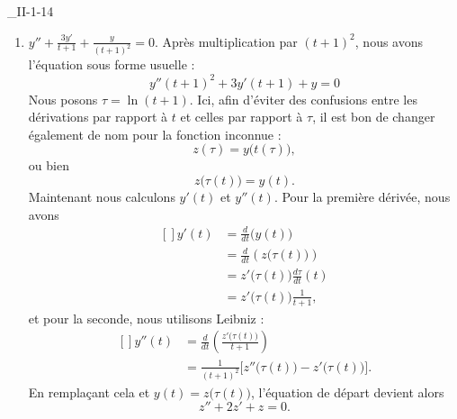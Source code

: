 \begin{corrige}{_II-1-14}

	\begin{enumerate}

		\item $y''+\frac{ 3y' }{ t+1 }+\frac{ y }{ (t+1)^2 }=0$.
		      Après multiplication par $(t+1)^2$, nous avons l'équation sous forme usuelle :
		      \begin{equation}	\label{EqEulerSSFormeII114}
			      y''(t+1)^2+3y'(t+1)+y=0
		      \end{equation}
		      Nous posons $\tau=\ln(t+1)$. Ici, afin d'éviter des confusions entre les dérivations par rapport à $t$ et celles par rapport à $\tau$, il est bon de changer également de nom pour la fonction inconnue :
		      \begin{equation}
			      z(\tau)=y\big( t(\tau) \big),
		      \end{equation}
		      ou bien
		      \begin{equation}
			      z\big( \tau(t) \big)=y(t).
		      \end{equation}
		      Maintenant nous calculons $y'(t)$ et $y''(t)$. Pour la première dérivée, nous avons
		      \begin{equation}
			      \begin{aligned}[]
				      y'(t) & =\frac{ d }{ dt }\big( y(t) \big)                    \\
				            & =\frac{ d }{ dt }\left( z\big( \tau(t) \big) \right) \\
				            & =z'\big( \tau(t) \big)\frac{ d\tau }{ dt }(t)        \\
				            & =z'\big( \tau(t) \big)\frac{ 1 }{ t+1 },
			      \end{aligned}
		      \end{equation}
		      et pour la seconde, nous utilisons Leibniz :
		      \begin{equation}
			      \begin{aligned}[]
				      y''(t) & =\frac{ d }{ dt }\left( \frac{ z'\big( \tau(t) \big) }{ t+1 } \right)          \\
				             & =\frac{1}{ (t+1)^2 }\Big[  z''\big( \tau(t) \big)-z'\big( \tau(t) \big) \Big].
			      \end{aligned}
		      \end{equation}
		      En remplaçant cela et $y(t)=z\big( \tau(t) \big)$, l'équation de départ devient alors
		      \begin{equation}
			      z''+2z'+z=0.

\end{equation}
\end{enumerate}
\end{corrige}
